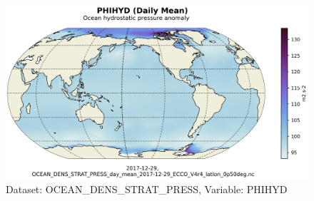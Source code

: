 \begin{figure}[H]
\centering
\includegraphics[scale=0.55]{../images/plots/latlon_plots/Ocean_Density_Stratification_and_Hydrostatic_Pressure/PHIHYD.png}
\caption{Dataset: OCEAN\_DENS\_STRAT\_PRESS, Variable: PHIHYD}
\label{tab:table-OCEAN_DENS_STRAT_PRESS_PHIHYD-Plot}
\end{figure}
\pagebreak
